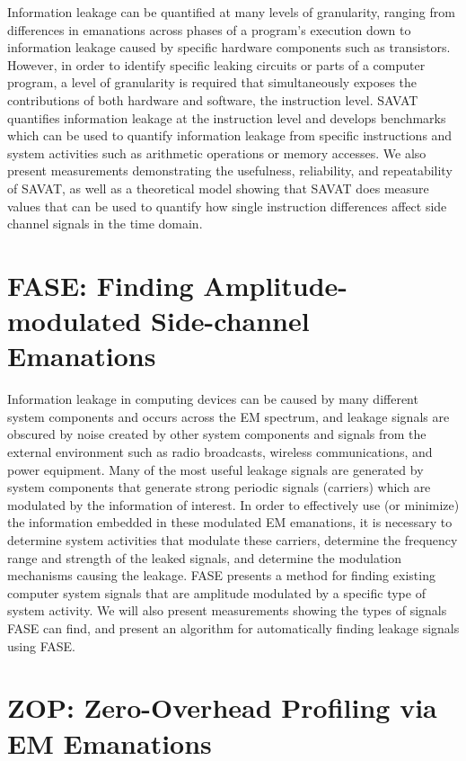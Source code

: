 Information leakage can be quantified at many levels of granularity, ranging from differences in emanations across phases of a program's execution down to information leakage caused by specific hardware components such as transistors. However, in order to identify specific leaking circuits or parts of a computer program, a level of granularity is required that simultaneously exposes the contributions of both hardware and software, \ie the instruction level. SAVAT quantifies information leakage at the instruction level and develops benchmarks which can be used to quantify information leakage from specific instructions and system activities such as arithmetic operations or memory accesses. We also present measurements demonstrating the usefulness, reliability, and repeatability of SAVAT, as well as a theoretical model showing that SAVAT does measure values that can be used to quantify how single instruction differences affect side channel signals in the time domain. 

\section{FASE: Finding Amplitude-modulated Side-channel Emanations}

Information leakage in computing devices can be caused by many different system components and occurs across the EM spectrum, and leakage signals are obscured by noise created by other system components and signals from the external environment such as radio broadcasts, wireless communications, and power equipment. Many of the most useful leakage signals are generated by system components that generate strong periodic signals (carriers) which are modulated by the information of interest. In order to effectively use (or minimize) the information embedded in these modulated EM emanations, it is necessary to determine system activities that modulate these carriers, determine the frequency range and strength of the leaked signals, and determine the modulation mechanisms causing the leakage. FASE presents a method for finding existing computer system signals that are amplitude modulated by a specific type of system activity. We will also present measurements showing the types of signals FASE can find, and present an algorithm for automatically finding leakage signals using FASE.

\section{ZOP: Zero-Overhead Profiling via EM Emanations}

